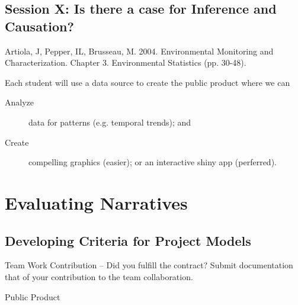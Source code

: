 \documentclass{article}\usepackage[]{graphicx}\usepackage[]{color}
\newenvironment{itemize*}%
  {\begin{itemize}%
    \setlength{\itemsep}{0pt}%
    \setlength{\parskip}{0pt}}%
  {\end{itemize}}
\begin{document}
\subsection{Session X: Is there a case for Inference and Causation?}

  \begin{itemize*}
  		\item Artiola, J, Pepper, IL, Brusseau, M. 2004. Environmental Monitoring and Characterization. Chapter 3. Environmental Statistics (pp. 30-48).
\end{itemize*}

Each student will use a data source to create the public product where we can 
\begin{description}
  \item[Analyze] data for patterns (e.g. temporal trends); and
  \item[Create] compelling graphics (easier); or an interactive shiny app (perferred).
\end{description}


\section{Evaluating Narratives}

\subsection{Developing Criteria for Project Models}

\begin{itemize*}
  \item Team Work Contribution -- Did you fulfill the contract? Submit documentation that of your contribution to the team collaboration.
  \item Public Product
\end{itemize*}
\end{document}

